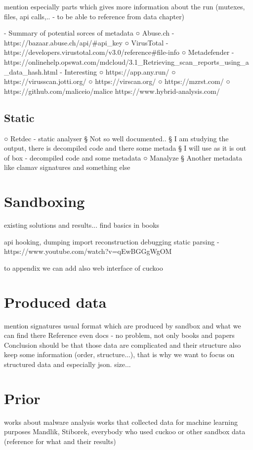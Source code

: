 mention especially parts which gives more information about the run (mutexes, files, api calls,.. - to be able to reference from data chapter)

- Summary of potential sorces of metadata
○ Abuse.ch - https://bazaar.abuse.ch/api/#api_key
○ VirusTotal - https://developers.virustotal.com/v3.0/reference#file-info
○ Metadefender - https://onlinehelp.opswat.com/mdcloud/3.1_Retrieving_scan_reports_using_a_data_hash.html
- Interesting
○ https://app.any.run/
○ https://virusscan.jotti.org/
○ https://virscan.org/
○ https://mzrst.com/
○ https://github.com/maliceio/malice
https://www.hybrid-analysis.com/

\subsection{Static}
○ Retdec - static analyser
§ Not so well documented..
§ I am studying the output, there is decompiled code and there some metada
§ I will use as it is out of box - decompiled code and some metadata
○ Manalyze
§ Another metadata like clamav signatures and something else


\section{Sandboxing}
existing solutions and results...
find basics in books

api hooking, dumping import reconstruction debugging static parsing - https://www.youtube.com/watch?v=qEwBGGgWgOM

to appendix we can add also web interface of cuckoo


\section{Produced data}
mention signatures
usual format which are produced by sandbox and what we can find there
Reference even docs - no problem, not only books and papers
Conclusion should be that those data are complicated and their structure also keep some information (order, structure...), that is why we want to focus on structured data and especially json.
size...

\section{Prior}
works about malware analysis
works that collected data for machine learning purposes
Mandlik, Stiborek, everybody who used cuckoo or other sandbox data (reference for what and their results)

